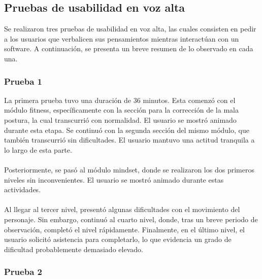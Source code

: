 \subsection{Pruebas de usabilidad en voz alta}

Se realizaron tres pruebas de usabilidad en voz alta, las cuales consisten en pedir a los usuarios que verbalicen sus pensamientos mientras interactúan con un software. A continuación, se presenta un breve resumen de lo observado en cada una.

\subsubsection{Prueba 1}
La primera prueba tuvo una duración de 36 minutos. Esta comenzó con el módulo fitness, específicamente con la sección para la corrección de la mala postura, la cual transcurrió con normalidad. El usuario se mostró animado durante esta etapa.
Se continuó con la segunda sección del mismo módulo, que también transcurrió sin dificultades. El usuario mantuvo una actitud tranquila a lo largo de esta parte.
\\\\
Posteriormente, se pasó al módulo mindset, donde se realizaron los dos primeros niveles sin inconvenientes. El usuario se mostró animado durante estas actividades.
\\\\
Al llegar al tercer nivel, presentó algunas dificultades con el movimiento del personaje. Sin embargo, continuó al cuarto nivel, donde, tras un breve periodo de observación, completó el nivel rápidamente. Finalmente, en el último nivel, el usuario solicitó asistencia para completarlo, lo que evidencia un grado de dificultad probablemente demasiado elevado.

\subsubsection{Prueba 2}

